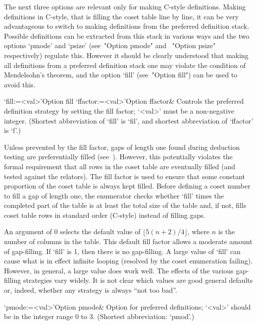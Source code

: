 
The  next  three  options  are  relevant  only  for   making   C-style
definitions. Making definitions in C-style, that is filling the  coset
table line by line, it can be very advantageous to  switch  to  making
definitions from the preferred definition stack. Possible  definitions
can be extracted from this stack in various ways and the  two  options
`pmode'  and  `psize'  (see~"Option   pmode"   and   ~"Option   psize"
respectively) regulate this. However it should be  clearly  understood
that making all definitions from a preferred definition stack one  may
violate the condition of Mendelsohn's theorem, and the  option  `fill'
(see~"Option fill") can be used to avoid this.

\>`fill:=<val>'{Option fill}
\>`ffactor:=<val>'{Option ffactor}&
Controls the preferred definition strategy by setting the fill factor;
`<val>' must be a non-negative integer.
(Shortest abbreviation of `fill' is `fil', and  shortest  abbreviation
of `ffactor' is `f'.)

Unless prevented by  the fill factor, gaps of  length one found during
deduction   testing  are  preferentially   filled  (see~\cite{Hav91}).
However,  this potentially  violates the  formal requirement  that all
rows in the coset table  are eventually filled (and tested against the
relators).   The fill  factor is  used  to ensure  that some  constant
proportion of the coset table  is always kept filled.  Before defining
a coset  number to  fill a  gap of length  one, the  enumerator checks
whether `fill' times  the completed part of the table  is at least the
total  size of  the  table and,  if  not, fills  coset  table rows  in
standard order (C-style) instead of filling gaps.

An  argument of  0  selects  the default  value  of $\lfloor  5(n+2)/4
\rfloor$,  where $n$  is the  number of  columns in  the  table.  This
default  fill factor  allows  a moderate  amount  of gap-filling.   If
`fill' is  1, then there is  no gap-filling.  A large  value of `fill'
can cause  what is in effect  infinite looping (resolved  by the coset
enumeration failing).   However, in general,  a large value  does work
well.  The  effects of the various gap-filling  strategies vary widely.
It is  not clear  which values are  good general defaults  or, indeed,
whether any strategy is always ``not too bad''.

\>`pmode:=<val>'{Option pmode}&
Option for preferred definitions;  `<val>' should be in the integer
range 0 to 3. (Shortest abbreviation: `pmod'.)

